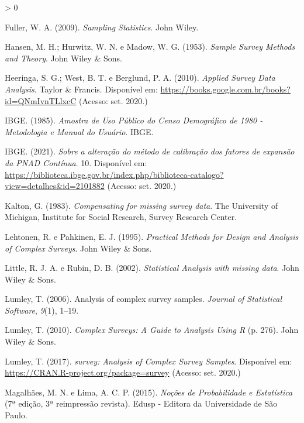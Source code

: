 \documentclass[
  12pt,
  brazilian,
]{book}
\newlength{\cslhangindent}
\newenvironment{CSLReferences}[2] %
 {%
  \setlength{\parindent}{0pt}
  \ifodd #1 \everypar{\setlength{\hangindent}{\cslhangindent}}\ignorespaces\fi
  \ifnum #2 > 0
  \setlength{\parskip}{#2\baselineskip}
  \fi
 }%
 {}
\theoremstyle{definition}
\theoremstyle{definition}
\theoremstyle{definition}
\theoremstyle{definition}
\theoremstyle{remark}
\begin{document}
\begin{CSLReferences}{1}{0}
\leavevmode\hypertarget{ref-Fuller2009}{}%
Fuller, W. A. (2009). \emph{Sampling Statistics}. John Wiley.

\leavevmode\hypertarget{ref-hansen1953}{}%
Hansen, M. H.; Hurwitz, W. N. e Madow, W. G. (1953). \emph{Sample Survey Methods and Theory}. John Wiley \& Sons.

\leavevmode\hypertarget{ref-heeringa}{}%
Heeringa, S. G.; West, B. T. e Berglund, P. A. (2010). \emph{Applied Survey Data Analysis}. Taylor \& Francis. Disponível em: \url{https://books.google.com.br/books?id=QNmIvnTLlxcC} (Acesso: set. 2020.)

\leavevmode\hypertarget{ref-IBGE1985}{}%
IBGE. (1985). \emph{Amostra de {Uso} {Público} do {Censo} {Demográfico} de 1980 - {Metodologia} e {Manual} do {Usuário}}. IBGE.

\leavevmode\hypertarget{ref-PNADC2021}{}%
IBGE. (2021). \emph{{Sobre a alteração do método de calibração dos fatores de expansão da PNAD Contínua}}. 10. Disponível em: \url{https://biblioteca.ibge.gov.br/index.php/biblioteca-catalogo?view=detalhes\&id=2101882} (Acesso: set. 2020.)

\leavevmode\hypertarget{ref-kalton83a}{}%
Kalton, G. (1983). \emph{Compensating for missing survey data}. The University of Michigan, Institute for Social Research, Survey Research Center.

\leavevmode\hypertarget{ref-lethonen}{}%
Lehtonen, R. e Pahkinen, E. J. (1995). \emph{Practical Methods for Design and Analysis of Complex Surveys}. John Wiley \& Sons.

\leavevmode\hypertarget{ref-LR2002}{}%
Little, R. J. A. e Rubin, D. B. (2002). \emph{Statistical Analysis with missing data}. John Wiley \& Sons.

\leavevmode\hypertarget{ref-Lumley2006}{}%
Lumley, T. (2006). Analysis of complex survey samples. \emph{Journal of Statistical Software}, \emph{9}(1), 1--19.

\leavevmode\hypertarget{ref-Lumley2010}{}%
Lumley, T. (2010). \emph{{Complex Surveys: A Guide to Analysis Using R}} (p. 276). John Wiley \& Sons.

\leavevmode\hypertarget{ref-R-survey}{}%
Lumley, T. (2017). \emph{survey: Analysis of Complex Survey Samples}. Disponível em: \url{https://CRAN.R-project.org/package=survey} (Acesso: set. 2020.)

\leavevmode\hypertarget{ref-Marcos2015}{}%
Magalhães, M. N. e Lima, A. C. P. (2015). \emph{Noções de Probabilidade e Estatística} (7ª edição, 3ª reimpressão revista). Edusp - Editora da Universidade de São Paulo.


\end{CSLReferences}
\end{document}
